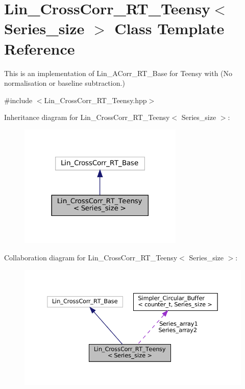 \hypertarget{classLin__CrossCorr__RT__Teensy}{}\section{Lin\+\_\+\+Cross\+Corr\+\_\+\+R\+T\+\_\+\+Teensy$<$ Series\+\_\+size $>$ Class Template Reference}
\label{classLin__CrossCorr__RT__Teensy}


This is an implementation of Lin\+\_\+\+A\+Corr\+\_\+\+R\+T\+\_\+\+Base for Teensy with {\bfseries }(No normalisation or baseline subtraction.)  




{\ttfamily \#include $<$Lin\+\_\+\+Cross\+Corr\+\_\+\+R\+T\+\_\+\+Teensy.\+hpp$>$}



Inheritance diagram for Lin\+\_\+\+Cross\+Corr\+\_\+\+R\+T\+\_\+\+Teensy$<$ Series\+\_\+size $>$\+:
\nopagebreak
\begin{figure}[H]
\begin{center}
\leavevmode
\includegraphics[width=222pt]{classLin__CrossCorr__RT__Teensy__inherit__graph}
\end{center}
\end{figure}


Collaboration diagram for Lin\+\_\+\+Cross\+Corr\+\_\+\+R\+T\+\_\+\+Teensy$<$ Series\+\_\+size $>$\+:
\nopagebreak
\begin{figure}[H]
\begin{center}
\leavevmode
\includegraphics[width=350pt]{classLin__CrossCorr__RT__Teensy__coll__graph}
\end{center}
\end{figure}
